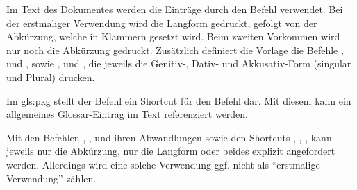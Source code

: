 \begin{latex}[caption={Definition einer Abkürzung mit Zusatzangaben},label={lst:AdvancedAcronymEntry}]
\end{latex}

Im Text des Dokumentes werden die Einträge durch den Befehl  verwendet.
Bei der erstmaliger Verwendung wird die Langform gedruckt, gefolgt von der Abkürzung, welche in Klammern gesetzt wird.
Beim zweiten Vorkommen wird nur noch die Abkürzung gedruckt.
Zusätzlich definiert die Vorlage die Befehle
,  und , sowie
,  und ,
die jeweils die Genitiv-, Dativ- und Akkusativ-Form (singular und Plural) drucken.

Im \gls{gls:pkg}  stellt der Befehl  ein Shortcut für den Befehl  dar.
Mit diesem kann ein allgemeines Glossar-Eintrag im Text referenziert werden.

Mit den Befehlen
, , 
und ihren Abwandlungen sowie den Shortcuts
, , ,
kann jeweils nur die Abkürzung, nur die Langform oder beides explizit angefordert werden.
Allerdings wird eine solche Verwendung ggf. nicht als \enquote{erstmalige Verwendung} zählen.

